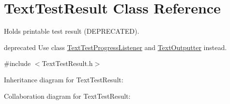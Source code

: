 \hypertarget{class_text_test_result}{\section{Text\+Test\+Result Class Reference}
\label{class_text_test_result}
}


Holds printable test result (D\+E\+P\+R\+E\+C\+A\+T\+E\+D).

deprecated Use class \hyperlink{class_text_test_progress_listener}{Text\+Test\+Progress\+Listener} and \hyperlink{class_text_outputter}{Text\+Outputter} instead.  




{\ttfamily \#include $<$Text\+Test\+Result.\+h$>$}



Inheritance diagram for Text\+Test\+Result\+:


Collaboration diagram for Text\+Test\+Result\+:
